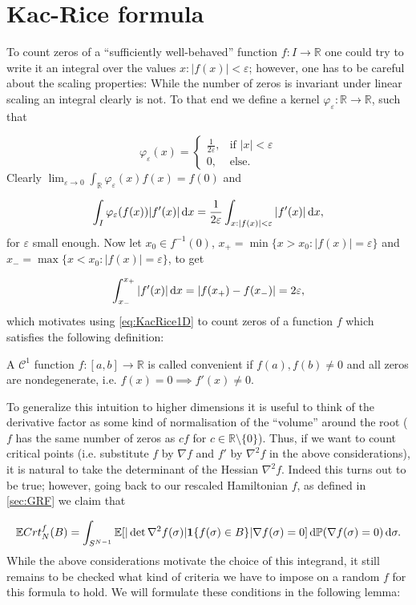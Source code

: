 \section{Kac-Rice formula}
To count zeros of a ``sufficiently well-behaved'' function $f:I\rightarrow\mathbb R$ one could try to write it an integral over the values $x:|f(x)|<\varepsilon$; however, one has to be careful about the scaling properties: While the number of zeros is invariant under linear scaling an integral clearly is not. To that end we define a kernel $\varphi_\varepsilon:\mathbb R\rightarrow\mathbb R$, such that

$$
\varphi_\varepsilon(x) = \begin{cases}
	\frac{1}{2\varepsilon}, &\mbox{if } |x|<\varepsilon \\
		0, &\mbox{else.}
\end{cases}$$
Clearly $\lim_{\varepsilon\rightarrow 0}\int_\mathbb{R}\varphi_\varepsilon(x)f(x)=f(0)$ and 

\begin{equation}\label{eq:KacRice1D}
	\int_I \varphi_\varepsilon(f(x))|f'(x)|\mathop{}\!\mathrm{d} x = \frac{1}{2\varepsilon}\int_{x:|f(x)|<\varepsilon}|f'(x)|\mathop{}\!\mathrm{d} x,
\end{equation}
for $\varepsilon$ small enough. Now let $x_0\in f^{-1}(0)$, $x_+=\min\{x>x_0: |f(x)|=\varepsilon\}$ and $x_-=\max\{x<x_0: |f(x)|=\varepsilon\}$, to get

$$\int_{x_-}^{x_+}|f'(x)|\mathop{}\!\mathrm{d} x = |f(x_+)-f(x_-)|=2\varepsilon,$$
which motivates using \eqref{eq:KacRice1D} to count zeros of a function $f$ which satisfies the following definition:
\begin{definition}
	A $\mathcal C^1$ function $f:[a,b]\rightarrow\mathbb R$ is called convenient if $f(a),f(b)\neq 0$ and all zeros are nondegenerate, i.e. $f(x)=0\implies f'(x)\neq 0$.
\end{definition}

To generalize this intuition to higher dimensions it is useful to think of the derivative factor as some kind of normalisation of the ``volume'' around the root ($f$ has the same number of zeros as $cf$ for $c\in\mathbb R\setminus\{0\}$). Thus, if we want to count critical points (i.e. substitute $f$ by $\nabla f$ and $f'$ by $\nabla^2 f$ in the above considerations), it is natural to take the determinant of the Hessian $\nabla^2 f$. Indeed this turns out to be true; however, going back to our rescaled Hamiltonian $f$, as defined in \ref{sec:GRF} we claim that

\begin{equation}\label{eq:KacRiceSN}
	\mathbb E Crt_N^f(B) = \int_{S^{N-1}}\mathbb E[|\det\nabla^2f(\sigma)|\mathbf 1\{f(\sigma)\in B\}|\nabla f(\sigma)=0]\mathop{}\!\mathrm{d}\mathbb P(\nabla f(\sigma)=0)\mathop{}\!\mathrm{d}\sigma.
\end{equation}
While the above considerations motivate the choice of this integrand, it still remains to be checked what kind of criteria we have to impose on a random $f$ for this formula to hold. We will formulate these conditions in the following lemma:

